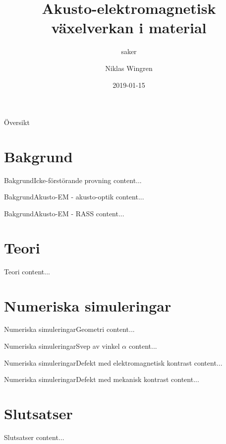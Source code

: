 \documentclass[11pt]{beamer}
\begin{document}
	\author{Niklas Wingren}
	\title[Akusto-elektromagnetisk växelverkan]{Akusto-elektromagnetisk växelverkan i material}
	\subtitle{saker}
	\date{2019-01-15}
	\frame[plain]{\maketitle}
	
	\begin{frame}{Översikt}
		\tableofcontents
	\end{frame}
	
	
	\section{Bakgrund}
	
	\begin{frame}{Bakgrund}{Icke-förstörande provning}
		content...
	\end{frame}
	
	\begin{frame}{Bakgrund}{Akusto-EM - akusto-optik}
		content...
	\end{frame}
	
	\begin{frame}{Bakgrund}{Akusto-EM - RASS}
		content...
	\end{frame}
	
	\section{Teori}
	
	\begin{frame}{Teori}{}
		content...
	\end{frame}
	
	\section{Numeriska simuleringar}
	
	\begin{frame}{Numeriska simuleringar}{Geometri}
		content...
	\end{frame}
	
	\begin{frame}{Numeriska simuleringar}{Svep av vinkel $\alpha$}
		content...
	\end{frame}
	
	\begin{frame}{Numeriska simuleringar}{Defekt med elektromagnetisk kontrast}
		content...
	\end{frame}
	
	\begin{frame}{Numeriska simuleringar}{Defekt med mekanisk kontrast}
		content...
	\end{frame}
	
	\section{Slutsatser}
	
	\begin{frame}{Slutsatser}
		content...
	\end{frame}
\end{document}
